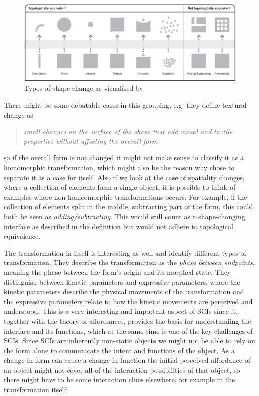 \begin{figure}[h]
  \centering
  \includegraphics[width=0.9\linewidth]{figures/types-of-change}
	\caption{Types of shape-change as visualised by \citep{rasmussen2012shape}}
   \label{types-of-change}
\end{figure}

There might be some debatable cases in this grouping, e.g. they define textural change as
\begin{quotation}
  \emph{small changes on the surface of the shape that add visual and tactile properties without affecting the overall form}
\end{quotation} 
so if the overall form is not changed it might not make sense to classify it as a homomorphic transformation, which might also be the reason why \citeauthor{coelho2011shape} chose to separate it as a case for itself.
Also if we look at the case of spatiality changes, where a collection of elements form a single object, it is possible to think of examples where non-homeomorphic transformations occurs.
For example, if the collection of elements split in the middle, subtracting part of the form, this could both be seen as \emph{adding/subtracting}.
This would still count as a shape-changing interface as described in the definition but would not adhere to topological equivalence.   

The transformation in itself is interesting as well and \citeauthor{rasmussen2012shape} identify different types of transformation.
They describe the transformation as the \textit{phase between endpoints}, meaning the phase between the form's origin and its morphed state.
They distinguish between kinetic parameters and expressive parameters, where the kinetic parameters describe the physical movements of the transformation and the expressive parameters relate to how the kinetic movements are perceived and understood.
This is a very interesting and important aspect of SCIs since it, together with the theory of affordances, provides the basis for understanding the interface and its functions, which at the same time is one of the key challenges of SCIs.
Since SCIs are inherently non-static objects we might not be able to rely on the form alone to communicate the intent and functions of the object. As a change in form can cause a change in function the initial perceived affordance of an object might not cover all of the interaction possibilities of that object, so there might have to be some interaction clues elsewhere, for example in the transformation itself.

